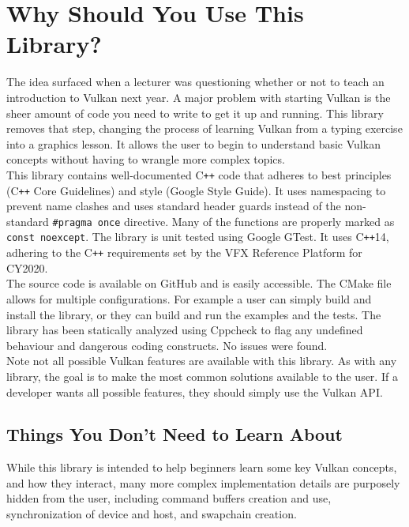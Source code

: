 \documentclass[12pt]{report}
\newcommand{\cpp}{C\texttt{++}}
\theoremstyle{definition}
\begin{document}
    \section{Why Should You Use This Library?}

      The idea surfaced when a lecturer was questioning whether or not to teach
      an introduction to Vulkan next year. A major problem with starting Vulkan
      is the sheer amount of code you need to write to get it up and running.
      This library removes that step, changing the process of learning Vulkan
      from a typing exercise into a graphics lesson. It allows the user to
      begin to understand basic Vulkan concepts without having to wrangle more
      complex topics. \\

      This library contains well-documented \cpp{} code that adheres to best
      principles (\cpp{} Core Guidelines) and style (Google Style Guide). It
      uses namespacing to prevent name clashes and uses standard header guards
      instead of the non-standard \verb|#pragma once| directive. Many of the
      functions are properly marked as \verb!const noexcept!. The library is unit
      tested using Google GTest. It uses \cpp14, adhering to the \cpp{}
      requirements set by the VFX Reference Platform for CY2020. \\

      The source code is available on GitHub and is easily accessible. The CMake
      file allows for multiple configurations. For example a user can simply
      build and install the library, or they can build and run the examples
      and the tests. The library has been statically analyzed using Cppcheck to
      flag any undefined behaviour and dangerous coding constructs. No issues
      were found. \\

      Note not all possible Vulkan features are available with this library.
      As with any library, the goal is to make the most common solutions
      available to the user. If a developer wants all possible features,
      they should simply use the Vulkan API.

      \subsection{Things You Don't Need to Learn About}

        While this library is intended to help beginners learn some key Vulkan
        concepts, and how they interact, many more complex implementation details
        are purposely hidden from the user, including command buffers creation and
        use, synchronization of device and host, and swapchain creation. \\
\end{document}

